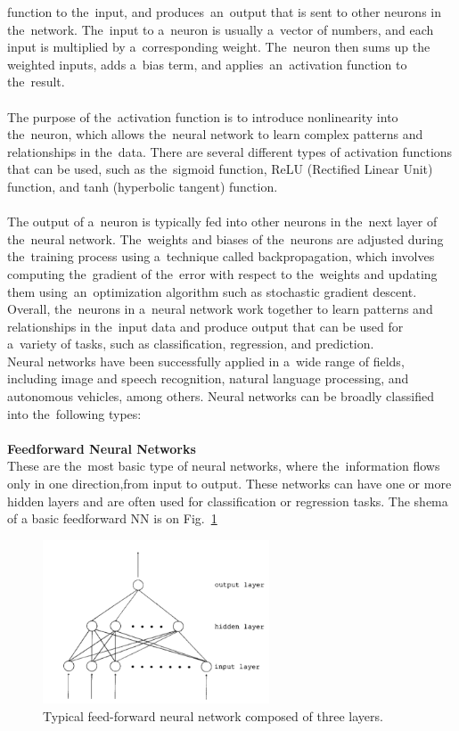 function to the~input, and produces~an~output that is sent to other neurons in the~network. The~input to a~neuron is
usually a~vector of numbers, and each input is multiplied by a~corresponding weight. The~neuron then sums up the
weighted inputs, adds a~bias term, and applies~an~activation function to the~result.\\
\\
The purpose of the~activation function is to introduce nonlinearity into the~neuron, which allows the~neural network
to learn complex patterns and relationships in the~data. There are several different types of activation functions
that can be used, such as the~sigmoid function, ReLU (Rectified Linear Unit) function, and tanh (hyperbolic tangent)
function.\\
\\
The output of a~neuron is typically fed into other neurons in the~next layer of the~neural network. The~weights and
biases of the~neurons are adjusted during the~training process using a~technique called backpropagation, which involves
computing the~gradient of the~error with respect to the~weights and updating them using~an~optimization algorithm such
as stochastic gradient descent.\\
Overall, the~neurons in a~neural network work together to learn patterns and relationships in the~input data and produce
output that can be used for a~variety of tasks, such as classification, regression, and prediction.\\
Neural networks have been successfully applied in a~wide range of fields, including image and speech recognition, natural language processing, and autonomous vehicles, among others.
Neural networks can be broadly classified into the~following types:\\
\\
\textbf{Feedforward Neural Networks}\\
These are the~most basic type of neural networks, where the~information flows
only in one direction,from input to output. These networks can have one or more hidden layers and are often used for classification or regression tasks. The shema of a basic feedforward NN is on Fig.~\ref{fig:ff}
    \begin{center}
        \begin{figure}[!ht]
            \centering
            \includegraphics[width=0.6\textwidth]{figures/ff}
            \caption{Typical feed-forward neural network composed of three layers. \cite{svozil1997quantum}}
            \label{fig:ff}
        \end{figure}
    \end{center}
